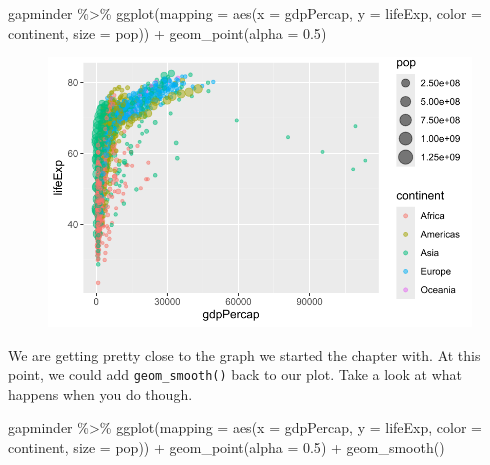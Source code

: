 \documentclass[
  letterpaper,
]{book}
\newenvironment{Shaded}{\begin{snugshade}}{\end{snugshade}}
\newcommand{\AttributeTok}[1]{\textcolor[rgb]{0.40,0.45,0.13}{#1}}
\newcommand{\FloatTok}[1]{\textcolor[rgb]{0.68,0.00,0.00}{#1}}
\newcommand{\FunctionTok}[1]{\textcolor[rgb]{0.28,0.35,0.67}{#1}}
\newcommand{\NormalTok}[1]{\textcolor[rgb]{0.00,0.23,0.31}{#1}}
\newcommand{\SpecialCharTok}[1]{\textcolor[rgb]{0.37,0.37,0.37}{#1}}
\begin{document}
\begin{Shaded}
\begin{Highlighting}[]
\NormalTok{gapminder }\SpecialCharTok{\%\textgreater{}\%}
  \FunctionTok{ggplot}\NormalTok{(}\AttributeTok{mapping =} \FunctionTok{aes}\NormalTok{(}\AttributeTok{x =}\NormalTok{ gdpPercap, }
                       \AttributeTok{y =}\NormalTok{ lifeExp,}
                       \AttributeTok{color =}\NormalTok{ continent,}
                       \AttributeTok{size =}\NormalTok{ pop)) }\SpecialCharTok{+}
  \FunctionTok{geom\_point}\NormalTok{(}\AttributeTok{alpha =} \FloatTok{0.5}\NormalTok{)}
\end{Highlighting}
\end{Shaded}

\begin{figure}[H]

{\centering \includegraphics{visualizing-with-ggplot_files/figure-pdf/unnamed-chunk-20-1.pdf}

}

\end{figure}

We are getting pretty close to the graph we started the chapter with. At
this point, we could add \texttt{geom\_smooth()} back to our plot. Take
a look at what happens when you do though.

\begin{Shaded}
\begin{Highlighting}[]
\NormalTok{gapminder }\SpecialCharTok{\%\textgreater{}\%}
  \FunctionTok{ggplot}\NormalTok{(}\AttributeTok{mapping =} \FunctionTok{aes}\NormalTok{(}\AttributeTok{x =}\NormalTok{ gdpPercap, }
                       \AttributeTok{y =}\NormalTok{ lifeExp,}
                       \AttributeTok{color =}\NormalTok{ continent,}
                       \AttributeTok{size =}\NormalTok{ pop)) }\SpecialCharTok{+}
  \FunctionTok{geom\_point}\NormalTok{(}\AttributeTok{alpha =} \FloatTok{0.5}\NormalTok{) }\SpecialCharTok{+}
  \FunctionTok{geom\_smooth}\NormalTok{()}
\end{Highlighting}
\end{Shaded}
\end{document}
